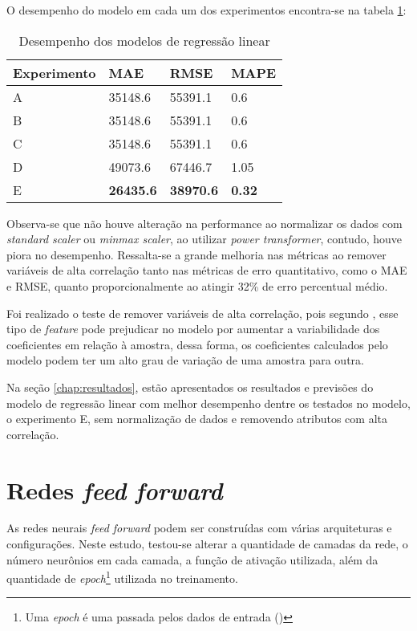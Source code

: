O desempenho do modelo em cada um dos experimentos 
encontra-se na 
tabela \ref{tab:res_reg_lin}:

\begin{table}[H]
    \centering
    \begin{tabular}{llll}
        \toprule
        Experimento & MAE     & RMSE    & MAPE \\
        \midrule
        A           & 35148.6 & 55391.1 & 0.6  \\
        B           & 35148.6 & 55391.1 & 0.6  \\
        C           & 35148.6 & 55391.1 & 0.6  \\
        D           & 49073.6 & 67446.7 & 1.05 \\
        E           & \textbf{26435.6} & \textbf{38970.6} & \textbf{0.32} \\
        \bottomrule
    \end{tabular}
    \caption{Desempenho dos modelos de regressão linear}
    \label{tab:res_reg_lin}
\end{table}

Observa-se que não houve alteração na performance ao normalizar 
os dados com \textit{standard scaler} ou \textit{minmax scaler},
ao utilizar \textit{power transformer}, contudo, houve piora 
no desempenho. Ressalta-se a grande melhoria nas métricas ao 
remover variáveis de alta correlação tanto nas métricas de erro 
quantitativo, como o MAE e RMSE, quanto proporcionalmente ao 
atingir 32\% de erro percentual médio.

Foi realizado o teste de remover variáveis de alta correlação, 
pois segundo \cite{corr_reg_lin}, esse tipo de \textit{feature}
pode prejudicar no modelo por aumentar a variabilidade
dos coeficientes em relação à amostra, dessa forma, os coeficientes 
calculados pelo modelo podem ter um alto grau de variação de uma 
amostra para outra.

Na seção \ref{chap:resultados}, estão apresentados os 
resultados e previsões do modelo de regressão linear com
melhor desempenho dentre os testados no modelo, o
experimento E, sem   
normalização de dados e removendo atributos com alta 
correlação.

\section{Redes \textit{feed forward}}

As redes neurais \textit{feed forward} podem ser construídas
com várias arquiteturas e configurações. Neste estudo, testou-se
alterar a quantidade de camadas da rede, o número neurônios em 
cada camada, a função de ativação utilizada, além da quantidade
de \textit{epoch}\footnote{Uma \textit{epoch} é uma passada 
pelos dados de entrada (\cite{dl-oreilly})} utilizada no treinamento.

